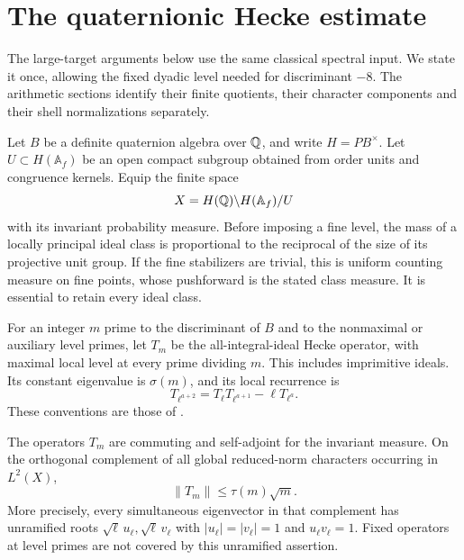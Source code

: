 \section{The quaternionic Hecke estimate}\label{sec:exact-hecke}

The large-target arguments below use the same classical spectral input.
We state it once, allowing the fixed dyadic level needed for discriminant
$-8$.  The arithmetic sections identify their finite quotients, their
character components and their shell normalizations separately.

Let $B$ be a definite quaternion algebra over $\mathbb Q$, and write
$H=PB^\times$.  Let $U\subset H(\mathbb A_f)$ be an open compact
subgroup obtained from order units and congruence kernels.  Equip the
finite space
\[
 X=H(\mathbb Q)\backslash H(\mathbb A_f)/U
\]
with its invariant probability measure.  Before imposing a fine level,
the mass of a locally principal ideal class is proportional to the
reciprocal of the size of its projective unit group.  If the fine
stabilizers are trivial, this is uniform counting measure on fine
points, whose pushforward is the stated class measure.  It is essential
to retain every ideal class.

For an integer $m$ prime to the discriminant of $B$ and to the
nonmaximal or auxiliary level primes, let $T_m$ be the all-integral-ideal
Hecke operator, with maximal local level at every prime dividing $m$.
This includes imprimitive ideals.  Its constant eigenvalue is
$\sigma(m)$, and its local recurrence is
\[
 T_{\ell^{a+2}}=T_\ell T_{\ell^{a+1}}-\ell T_{\ell^a}.
\]
These conventions are those of
\cite[Propositions~41.3.1 and~41.3.6]{Voight}.

\begin{lemma}\label{lem:hecke-transfer}
The operators $T_m$ are commuting and self-adjoint for the invariant
measure.  On the orthogonal complement of all global reduced-norm
characters occurring in $L^2(X)$,
\[
                         \|T_m\|\le\tau(m)\sqrt m.
\]
More precisely, every simultaneous eigenvector in that complement has
unramified roots $\sqrt\ell\,u_\ell,\sqrt\ell\,v_\ell$ with
$|u_\ell|=|v_\ell|=1$ and $u_\ell v_\ell=1$.  Fixed operators at level
primes are not covered by this unramified assertion.
\end{lemma}

